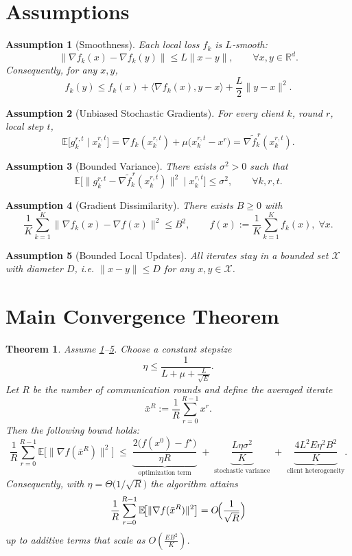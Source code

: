 \documentclass{article}
\newtheorem{theorem}{Theorem}
\newtheorem{assumption}{Assumption}
\newcommand{\E}{\mathbb{E}}
\newcommand{\R}{\mathbb{R}}
\begin{document}
\newpage
\section*{Assumptions}
\begin{assumption}[Smoothness]\label{as:smooth}
Each local loss $f_k$ is $L$‑smooth:
\[
    \|\nabla f_k(x)-\nabla f_k(y)\|\le L\|x-y\|,\qquad\forall x,y\in\R^{d}.
\]
Consequently, for any $x,y$,
\[
    f_k(y)\le f_k(x)+\langle\nabla f_k(x),y-x\rangle+\frac{L}{2}\|y-x\|^{2}. \tag{A1}
\]
\end{assumption}

\begin{assumption}[Unbiased Stochastic Gradients]\label{as:unbiased}
For every client $k$, round $r$, local step $t$,
\[
    \E\!\bigl[g_{k}^{r,t}\mid x_{k}^{r,t}\bigr]=\nabla f_k(x_{k}^{r,t})+\mu\bigl(x_{k}^{r,t}-x^{r}\bigr)
    =\nabla \tilde f_{k}^{\,r}(x_{k}^{r,t}).
\]
\end{assumption}

\begin{assumption}[Bounded Variance]\label{as:var}
There exists $\sigma^{2}>0$ such that
\[
    \E\!\bigl[\|g_{k}^{r,t}-\nabla \tilde f_{k}^{\,r}(x_{k}^{r,t})\|^{2}\mid x_{k}^{r,t}\bigr]\le\sigma^{2},
    \qquad\forall k,r,t.
\]
\end{assumption}

\begin{assumption}[Gradient Dissimilarity]\label{as:dissim}
There exists $B\ge0$ with
\[
    \frac{1}{K}\sum_{k=1}^{K}\|\nabla f_k(x)-\nabla f(x)\|^{2}\le B^{2},\qquad
    f(x):=\frac{1}{K}\sum_{k=1}^{K}f_k(x),\;\forall x.
\]
\end{assumption}

\begin{assumption}[Bounded Local Updates]\label{as:bounded}
All iterates stay in a bounded set $\mathcal{X}$ with diameter $D$, i.e.
$\|x-y\|\le D$ for any $x,y\in\mathcal{X}$.
\end{assumption}

\section*{Main Convergence Theorem}
\begin{theorem}\label{thm:main}
Assume \ref{as:smooth}–\ref{as:bounded}. Choose a constant stepsize
\[
    \eta\le\frac{1}{L+ \mu + \frac{L}{\sqrt{E}}}.
\]
Let $R$ be the number of communication rounds and define the averaged iterate
\[
    \bar x^{R}:=\frac{1}{R}\sum_{r=0}^{R-1}x^{r}.
\]
Then the following bound holds:
\[
\frac{1}{R}\sum_{r=0}^{R-1}\E\!\bigl[\|\nabla f(\bar x^{R})\|^{2}\bigr]
\;\le\;
\underbrace{\frac{2\bigl(f(x^{0})-f^{\star}\bigr)}{\eta R}}_{\text{optimization term}}
\;+\;
\underbrace{ \frac{L\eta\sigma^{2}}{K}}_{\text{stochastic variance}}
\;+\;
\underbrace{ \frac{4L^{2}E\eta^{2}B^{2}}{K}}_{\text{client heterogeneity}}.
\]
Consequently, with $\eta= \Theta\!\bigl(1/\sqrt{R}\bigr)$ the algorithm attains
\[
\frac{1}{R}\sum_{r=0}^{R-1}\E\!\bigl[\|\nabla f(\bar x^{R})\|^{2}\bigr]=O\!\Bigl(\frac{1}{\sqrt{R}}\Bigr)
\]
up to additive terms that scale as $O(\frac{E B^{2}}{K})$.
\end{theorem}
\end{document}
